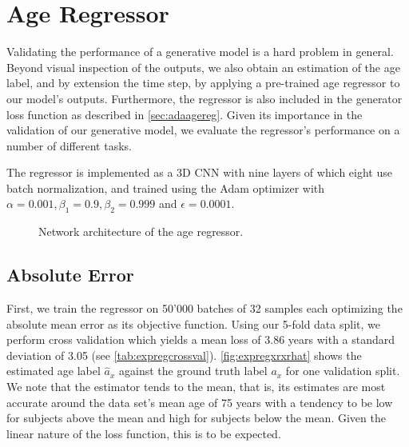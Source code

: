 \section{Age Regressor}
\label{sec:expreg}
Validating the performance of a generative model is a hard problem in general. Beyond visual inspection of the outputs, we also obtain an estimation of the age label, and by extension the time step, by applying a pre-trained age regressor to our model's outputs. Furthermore, the regressor is also included in the generator loss function as described in \autoref{sec:adaagereg}. Given its importance in the validation of our generative model, we evaluate the regressor's performance on a number of different tasks.

The regressor is implemented as a 3D CNN with nine layers of which eight use batch normalization, and trained using the Adam optimizer with $\alpha = 0.001, \beta_1 = 0.9, \beta_2 = 0.999 $ and $ \epsilon = 0.0001 $.

\begin{figure}[h]
	\centering
	
	\caption{Network architecture of the age regressor.}
	\label{fig:archreg}
\end{figure}

\subsection*{Absolute Error}
First, we train the regressor on 50'000 batches of 32 samples each optimizing the absolute mean error as its objective function. Using our 5-fold data split, we perform cross validation which yields a mean loss of 3.86 years with a standard deviation of 3.05 (see \autoref{tab:expregcrossval}). \autoref{fig:expregxrxrhat} shows the estimated age label $ \hat a_x $ against the ground truth label $a_x$ for one validation split. We note that the estimator tends to the mean, that is, its estimates are most accurate around the data set's mean age of 75 years with a tendency to be low for subjects above the mean and high for subjects below the mean. Given the linear nature of the loss function, this is to be expected.

